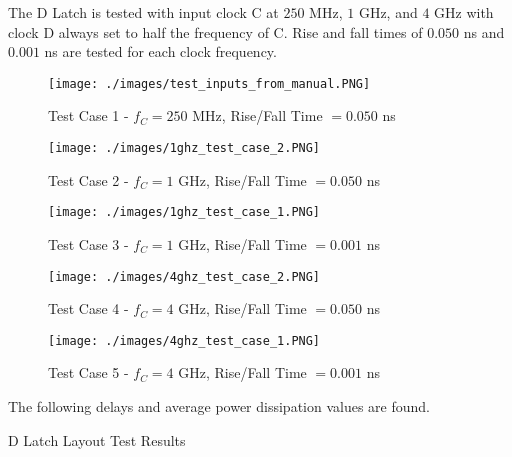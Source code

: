 The D Latch is tested with input clock C at $250$ \si{\mega\hertz}, $1$ \si{\giga\hertz}, and $4$ \si{\giga\hertz} with clock D always set to half the frequency of C.
Rise and fall times of $0.050$ \si{\nano\second} and $0.001$ \si{\nano\second} are tested for each clock frequency.

\FloatBarrier

\begin{figure}[h!]
	\centering
	\texttt{[image: ./images/test\_inputs\_from\_manual.PNG]}
	\caption{Test Case 1 - $f_C = 250$ \si{\mega\hertz}, Rise/Fall Time $= 0.050$ \si{\nano\second}}
	\label{fig:layout_test_1}
\end{figure}

\FloatBarrier

\begin{figure}[h!]
	\centering
	\texttt{[image: ./images/1ghz\_test\_case\_2.PNG]}
	\caption{Test Case 2 - $f_C = 1$ \si{\giga\hertz}, Rise/Fall Time $= 0.050$ \si{\nano\second}}
	\label{fig:layout_test_2}
\end{figure}

\FloatBarrier

\begin{figure}[h!]
	\centering
	\texttt{[image: ./images/1ghz\_test\_case\_1.PNG]}
	\caption{Test Case 3 - $f_C = 1$ \si{\giga\hertz}, Rise/Fall Time $= 0.001$ \si{\nano\second}}
	\label{fig:layout_test_3}
\end{figure}

\FloatBarrier

\begin{figure}[h!]
	\centering
	\texttt{[image: ./images/4ghz\_test\_case\_2.PNG]}
	\caption{Test Case 4 - $f_C = 4$ \si{\giga\hertz}, Rise/Fall Time $= 0.050$ \si{\nano\second}}
	\label{fig:layout_test_4}
\end{figure}

\FloatBarrier

\begin{figure}[h!]
	\centering
	\texttt{[image: ./images/4ghz\_test\_case\_1.PNG]}
	\caption{Test Case 5 - $f_C = 4$ \si{\giga\hertz}, Rise/Fall Time $= 0.001$ \si{\nano\second}}
	\label{fig:layout_test_5}
\end{figure}

\FloatBarrier

The following delays and average power dissipation values are found.

\FloatBarrier

\begin{table}[h!]
	\centering
	\caption{D Latch Layout Test Results}
	\label{tab:dlatch_test_results}
\end{table}

